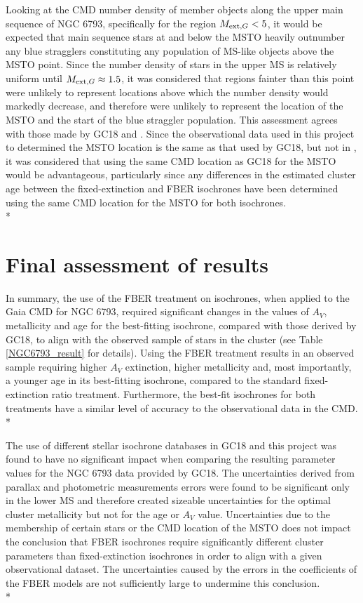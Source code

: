 \documentclass[12pt, a4paper]{report}
\begin{document}
Looking at the CMD number density of member objects along the upper main sequence of NGC 6793, specifically for the region $M_{\textnormal{ext},G} < 5$, it would be expected that main sequence stars at and below the MSTO heavily outnumber any blue stragglers constituting any population of MS-like objects above the MSTO point. Since the number density of stars in the upper MS is relatively uniform until $M_{\textnormal{ext},G} \approx 1.5$, it was considered that regions fainter than this point were unlikely to represent locations above which the number density would markedly decrease, and therefore were unlikely to represent the location of the MSTO and the start of the blue straggler population. This assessment agrees with those made by GC18 and \cite{2019A&A...623A.108B}. Since the observational data used in this project to determined the MSTO location is the same as that used by GC18, but not in \cite{2019A&A...623A.108B}, it was considered that using the same CMD location as GC18 for the MSTO would be advantageous, particularly since any differences in the estimated cluster age between the fixed-extinction and FBER isochrones have been determined using the same CMD location for the MSTO for both isochrones.\\*

\section{Final assessment of results}

In summary, the use of the FBER treatment on isochrones, when applied to the Gaia CMD for NGC 6793, required significant changes in the values of $A_{V}$, metallicity and age for the best-fitting isochrone, compared with those derived by GC18, to align with the observed sample of stars in the cluster (see Table \ref{NGC6793_result} for details). Using the FBER treatment results in an observed sample requiring higher $A_{V}$ extinction, higher metallicity and, most importantly, a younger age in its best-fitting isochrone, compared to the standard fixed-extinction ratio treatment. Furthermore, the best-fit isochrones for both treatments have a similar level of accuracy to the observational data in the CMD.\\*

The use of different stellar isochrone databases in GC18 and this project was found to have no significant impact when comparing the resulting parameter values for the NGC 6793 data provided by GC18. The uncertainties derived from parallax and photometric measurements errors were found to be significant only in the lower MS and therefore created sizeable uncertainties for the optimal cluster metallicity but not for the age or $A_{V}$ value. Uncertainties due to the membership of certain stars or the CMD location of the MSTO does not impact the conclusion that FBER isochrones require significantly different cluster parameters than fixed-extinction isochrones in order to align with a given observational dataset. The uncertainties caused by the errors in the coefficients of the FBER models are not sufficiently large to undermine this conclusion.\\*
\end{document}
